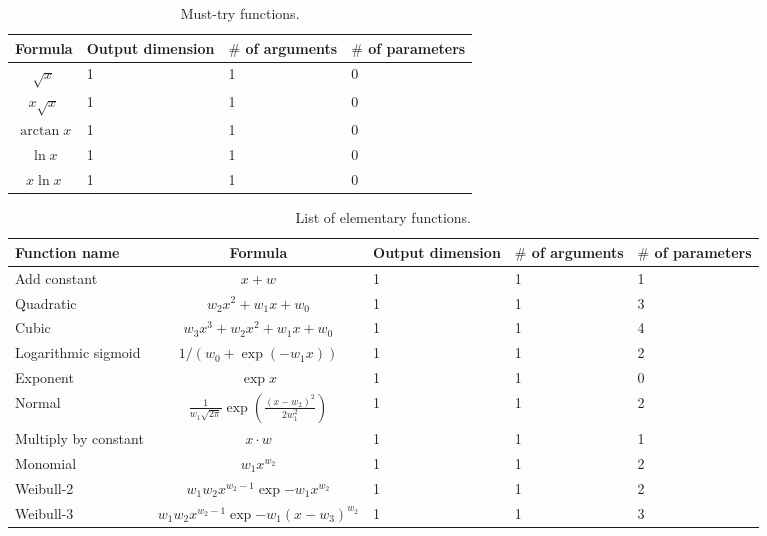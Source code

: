 \documentclass[12pt]{article}
\begin{document}
\begin{table}[!ht]
\caption{Must-try functions.}
\label{tb:elemetaries}
\begin{tabular}{|c|p{50pt}|p{50pt}|p{50pt}|}
\hline
Formula		&	Output dimension	&	$\#$ of arguments	&	$\#$ of parameters	\\ \hline
$	\sqrt{x}	$	&	1	&	1	&	0	\\ \hline
$	x\sqrt{x}	$	&	1	&	1	&	0	\\ \hline
$	\arctan{x}	$	&	1	&	1	&	0	\\ \hline
$	\ln{x}	$	&	1	&	1	&	0	\\ \hline
$	x\ln{x}	$	&	1	&	1	&	0	\\ \hline
\end{tabular}
\end{table}

\begin{table}[!ht]
\caption{List of elementary functions.}
\label{tb:elemetaries}
\begin{tabular}{|p{90pt}|c|p{50pt}|p{50pt}|p{50pt}|}
\hline
Function name	&		Formula		&	Output dimension	&	$\#$ of arguments	&	$\#$ of parameters	\\ \hline
Add constant	&	$	x + w	$	&	1	&	1	&	1	\\ \hline
Quadratic	&	$	w_2 x^2 + w_1 x + w_0	$	&	1	&	1	&	3	\\ \hline
Cubic	&	$	w_3x^3 + w_2 x^2 + w_1 x + w_0	$	&	1	&	1	&	4	\\ \hline
Logarithmic sigmoid	&	$	1/(w_0 + \exp(-w_1x))	$	&	1	&	1	&	2	\\ \hline
Exponent	&	$	\exp{x}	$	&	1	&	1	&	0	\\ \hline
Normal	&	$	\frac{1}{w_1\sqrt{2\pi}}\exp\left(\frac{(x-w_2)^2}{2w_1^2}\right)	$	&	1	&	1	&	2	\\ \hline
Multiply by constant	&	$	x\cdot w	$	&	1	&	1	&	1	\\ \hline
Monomial	&	$	w_1 x^{w_2}	$	&	1	&	1	&	2	\\ \hline
Weibull-2	&	$	w_1w_2x^{w_2-1}\exp{-w_1x^{w_2}}	$	&	1	&	1	&	2	\\ \hline
Weibull-3	&	$	w_1w_2x^{w_2-1}\exp{-w_1(x-w_3)^{w_2}}	$	&	1	&	1	&	3	\\ \hline
\end{tabular}
\end{table}
\end{document}
